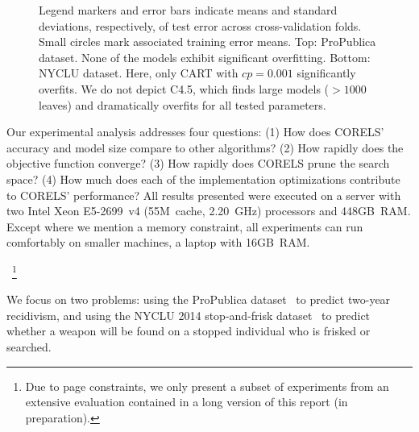 \begin{figure}[t!]
{%
%
Legend markers and error bars indicate means and standard deviations,
respectively, of test error across cross-validation folds.
%
Small circles mark associated training error means.
%
Top:  %
ProPublica dataset.
%
None of the models exhibit significant overfitting.
%
Bottom:  %
NYCLU dataset.
%
Here, only CART with ${cp = 0.001}$ significantly overfits.
%
We do not depict C4.5, which finds large models (${>1000}$ leaves)
and dramatically overfits for all tested parameters.
}
\label{fig:sparsity}
\end{figure}


Our experimental analysis addresses four questions:
(1) How does CORELS' accuracy and model size compare to other algorithms?
(2) How rapidly does the objective function converge?
(3) How rapidly does CORELS prune the search space?
(4) How much does each of the implementation optimizations contribute to CORELS' performance?
%
All results presented were executed on a server with two Intel Xeon E5-2699~v4
(55M~cache, 2.20~GHz) processors and 448GB~RAM.
%
Except where we mention a memory constraint, all experiments
can run comfortably on smaller machines, \eg a laptop with 16GB~RAM.\begin{kdd}
~\footnote{Due to page constraints, we only present a subset of experiments from
an extensive evaluation contained in a long version of this report (in preparation).}
\end{kdd}
%
We focus on two problems:
using the ProPublica dataset~\cite{LarsonMaKiAn16} to predict two-year recidivism,
and using the NYCLU 2014 stop-and-frisk dataset~\cite{nyclu:2014} to predict
whether a weapon will be found on a stopped individual who is frisked or searched.


